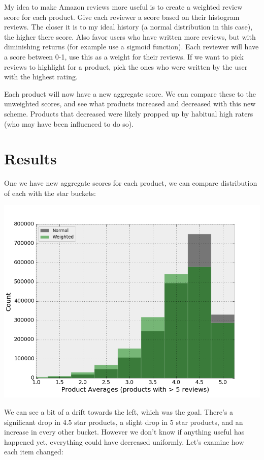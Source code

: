 \documentclass[a4paper,11pt]{article}
\begin{document}
My idea to make Amazon reviews more useful is to create a weighted review score for each product. Give each reviewer a score based on their histogram reviews. The closer it is to my ideal history (a normal distribution in this case), the higher there score. Also favor users who have written more reviews, but with diminishing returns (for example use a sigmoid function). Each reviewer will have a score between 0-1, use this as a weight for their reviews. If we want to pick reviews to highlight for a product, pick the ones who were written by the user with the highest rating.

Each product will now have a new aggregate score. We can compare these to the unweighted scores, and see what products increased and decreased with this new scheme. Products that decreased were likely propped up by habitual high raters (who may have been influenced to do so).

\section*{Results}
One we have new aggregate scores for each product, we can compare distribution of each with the star buckets:
\begin{center}
    \includegraphics[scale=0.65]{normascore_vs_regular.png}
\end{center}

We can see a bit of a drift towards the left, which was the goal. There's a significant drop in 4.5 star products, a slight drop in 5 star products, and an increase in every other bucket. However we don't know if anything useful has happened yet, everything could have decreased uniformly. Let's examine how each item changed:
\end{document}
